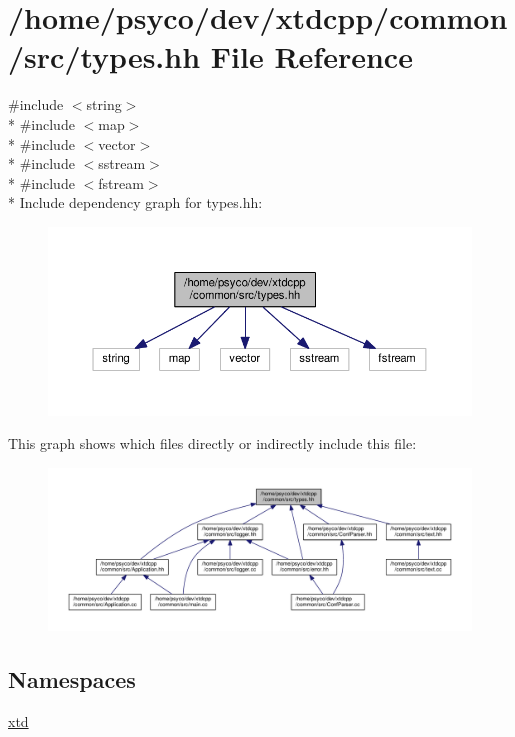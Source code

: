 \hypertarget{types_8hh}{}\section{/home/psyco/dev/xtdcpp/common/src/types.hh File Reference}
\label{types_8hh}
{\ttfamily \#include $<$string$>$}\\*
{\ttfamily \#include $<$map$>$}\\*
{\ttfamily \#include $<$vector$>$}\\*
{\ttfamily \#include $<$sstream$>$}\\*
{\ttfamily \#include $<$fstream$>$}\\*
Include dependency graph for types.\+hh\+:
\nopagebreak
\begin{figure}[H]
\begin{center}
\leavevmode
\includegraphics[width=350pt]{types_8hh__incl}
\end{center}
\end{figure}
This graph shows which files directly or indirectly include this file\+:
\nopagebreak
\begin{figure}[H]
\begin{center}
\leavevmode
\includegraphics[width=350pt]{types_8hh__dep__incl}
\end{center}
\end{figure}
\subsection*{Namespaces}
\begin{DoxyCompactItemize}
\item 
 \hyperlink{namespacextd}{xtd}
\end{DoxyCompactItemize}
